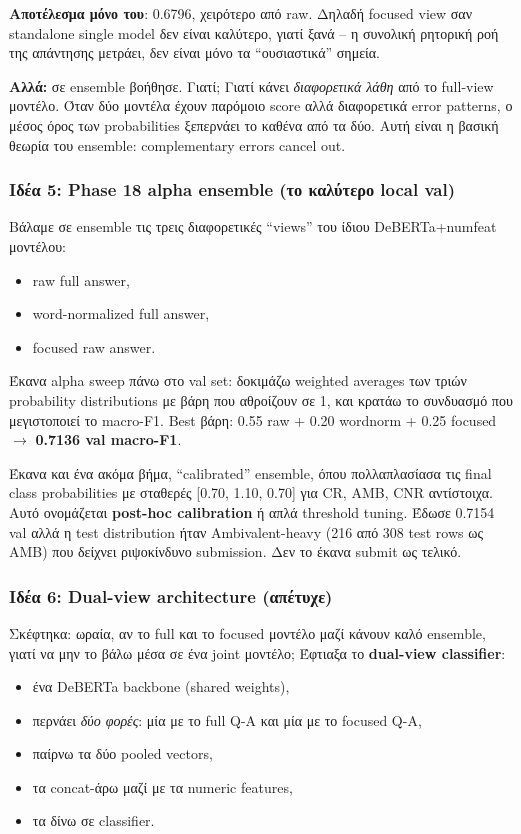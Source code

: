 \documentclass[12pt]{fphw}
\begin{document}
\textbf{Αποτέλεσμα μόνο του}: 0.6796, χειρότερο από raw. Δηλαδή focused view σαν standalone single model δεν είναι καλύτερο, γιατί ξανά -- η συνολική ρητορική ροή της απάντησης μετράει, δεν είναι μόνο τα ``ουσιαστικά'' σημεία.

\textbf{Αλλά:} σε ensemble βοήθησε. Γιατί; Γιατί κάνει \emph{διαφορετικά λάθη} από το full-view μοντέλο. Όταν δύο μοντέλα έχουν παρόμοιο score αλλά διαφορετικά error patterns, ο μέσος όρος των probabilities ξεπερνάει το καθένα από τα δύο. Αυτή είναι η βασική θεωρία του ensemble: complementary errors cancel out.

\subsubsection{Ιδέα 5: Phase 18 alpha ensemble (το καλύτερο local val)}

Βάλαμε σε ensemble τις τρεις διαφορετικές ``views'' του ίδιου DeBERTa+numfeat μοντέλου:
\begin{itemize}
    \item raw full answer,
    \item word-normalized full answer,
    \item focused raw answer.
\end{itemize}

Έκανα alpha sweep πάνω στο val set: δοκιμάζω weighted averages των τριών probability distributions με βάρη που αθροίζουν σε 1, και κρατάω το συνδυασμό που μεγιστοποιεί το macro-F1. Best βάρη: 0.55 raw + 0.20 wordnorm + 0.25 focused $\rightarrow$ \textbf{0.7136 val macro-F1}.

Έκανα και ένα ακόμα βήμα, ``calibrated'' ensemble, όπου πολλαπλασίασα τις final class probabilities με σταθερές [0.70, 1.10, 0.70] για CR, AMB, CNR αντίστοιχα. Αυτό ονομάζεται \textbf{post-hoc calibration} ή απλά threshold tuning. Έδωσε 0.7154 val αλλά η test distribution ήταν Ambivalent-heavy (216 από 308 test rows ως AMB) που δείχνει ριψοκίνδυνο submission. Δεν το έκανα submit ως τελικό.

\subsubsection{Ιδέα 6: Dual-view architecture (απέτυχε)}

Σκέφτηκα: ωραία, αν το full και το focused μοντέλο μαζί κάνουν καλό ensemble, γιατί να μην το βάλω μέσα σε ένα joint μοντέλο; Έφτιαξα το \textbf{dual-view classifier}:

\begin{itemize}
    \item ένα DeBERTa backbone (shared weights),
    \item περνάει \emph{δύο φορές}: μία με το full Q-A και μία με το focused Q-A,
    \item παίρνω τα δύο pooled vectors,
    \item τα concat-άρω μαζί με τα numeric features,
    \item τα δίνω σε classifier.
\end{itemize}
\end{document}
